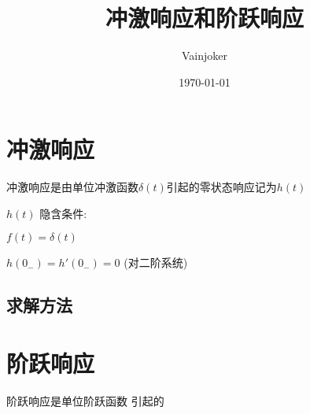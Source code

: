 \documentclass{article}
\title{冲激响应和阶跃响应}
\author{Vainjoker}
\date{\today}
\begin{document}
    \maketitle
    \newpage

    \section{冲激响应}%
    冲激响应是由单位冲激函数$\delta(t)$引起的零状态响应记为$h(t)$

    $h(t)$ 隐含条件:

    $f(t)=\delta (t)$

    $h(0_-)=h'(0_-)=0$ (对二阶系统)

    \subsection{求解方法}%
    


    \section{阶跃响应}%
    阶跃响应是单位阶跃函数 引起的
    
\end{document}
